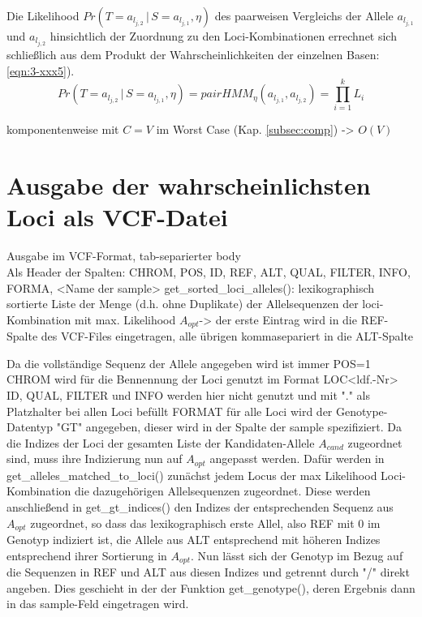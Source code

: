 Die Likelihood $ Pr(T=a_{l_{j,2}} \, | \, S=a_{l_{j,1}}, \eta) $ des paarweisen Vergleichs der Allele $a_{l_{j,1}}$ und $a_{l_{j,2}}$ hinsichtlich der Zuordnung zu den Loci-Kombinationen errechnet sich schließlich aus dem Produkt der Wahrscheinlichkeiten der einzelnen Basen:
\eqref{eqn:3-xxx5}).
\begin{equation} \label{eqn:3-xxx5}
\tag{3-xxx5}
Pr(T=a_{l_{j,2}} \, | \, S=a_{l_{j,1}}, \eta) = pairHMM_{\eta}(a_{l_{j,1}}, a_{l_{j,2}}) = \prod_{i=1}^{k}L_{i}
\end{equation}


komponentenweise mit $C = V$ im Worst Case (Kap. \ref{subsec:comp}) -> $O(V)$

\section{Ausgabe der wahrscheinlichsten Loci als VCF-Datei} \label{sec:vcf}

Ausgabe im VCF-Format, tab-separierter body\\
Als Header der Spalten: CHROM, POS, ID, REF, ALT, QUAL, FILTER, INFO, FORMA, <Name der sample>
get\_sorted\_loci\_alleles(): lexikographisch sortierte Liste der Menge (d.h. ohne Duplikate) der Allelsequenzen der loci-Kombination mit max. Likelihood $A_{opt}$-> der erste Eintrag wird in die REF-Spalte des VCF-Files eingetragen, alle übrigen kommasepariert in die ALT-Spalte

Da die vollständige Sequenz der Allele angegeben wird ist immer POS=1
CHROM wird für die Bennennung der Loci genutzt im Format LOC<ldf.-Nr>
ID, QUAL, FILTER und INFO werden hier nicht genutzt und mit "." als Platzhalter bei allen Loci befüllt
FORMAT für alle Loci wird der Genotype-Datentyp "GT" angegeben, dieser wird in der Spalte der sample spezifiziert. Da die Indizes der Loci der gesamten Liste der Kandidaten-Allele $A_{cand}$ zugeordnet sind, muss ihre Indizierung nun auf $A_{opt}$ angepasst werden.  Dafür werden in get\_alleles\_matched\_to\_loci() zunächst jedem Locus der max Likelihood Loci-Kombination die dazugehörigen Allelsequenzen zugeordnet. Diese werden anschließend in get\_gt\_indices() den Indizes der entsprechenden Sequenz aus $A_{opt}$ zugeordnet, so dass das lexikographisch erste Allel, also REF mit 0 im Genotyp indiziert ist, die Allele aus ALT entsprechend mit höheren Indizes entsprechend ihrer Sortierung in $A_{opt}$. Nun lässt sich der Genotyp im Bezug auf die Sequenzen in REF und ALT aus diesen Indizes und getrennt durch "/" direkt angeben. Dies geschieht in der der Funktion get\_genotype(), deren Ergebnis dann in das sample-Feld eingetragen wird.
